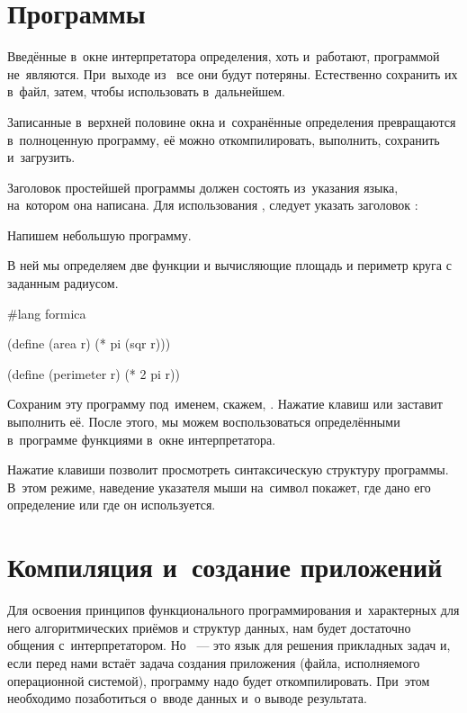\section[2]{Программы \Scheme}%
Введённые в~окне интерпретатора определения, хоть и~работают, программой не~являются. При~выходе из~ все они будут потеряны. Естественно сохранить их в~файл, затем, чтобы использовать в~дальнейшем.

Записанные в~верхней половине окна  и~сохранённые определения превращаются в~полноценную программу, её можно откомпилировать, выполнить, сохранить и~загрузить.

Заголовок простейшей программы должен состоять из~указания языка, на~котором она написана. Для использования \Scheme, следует указать заголовок :

\begin{example}{Напишем небольшую программу.

В ней мы определяем две функции  и  вычисляющие площадь и периметр круга с заданным радиусом.}
\begin{ExampleCode}[emph={r}]
#lang formica

 (define (area r)
   (* pi (sqr r)))

 (define (perimeter r)
   (* 2 pi r))
\end{ExampleCode}
\end{example}

Сохраним эту программу под~именем, скажем, . Нажатие клавиш  или  заставит  выполнить её. После этого, мы можем воспользоваться определёнными в~программе функциями в~окне интерпретатора.

Нажатие клавиши  позволит просмотреть синтаксическую структуру программы. В~этом режиме, наведение указателя мыши на~символ покажет, где дано его определение или где  он используется.


\section[4]{Компиляция и~создание приложений}\label{compilation}%
Для освоения принципов функционального программирования и~характерных для него алгоритмических приёмов и структур данных, нам будет достаточно общения с~интерпретатором. Но \Scheme~--- это язык для решения прикладных задач и, если перед нами встаёт задача создания приложения (файла, исполняемого операционной системой), программу надо будет откомпилировать. При~этом необходимо позаботиться о~вводе данных и~о выводе результата.

